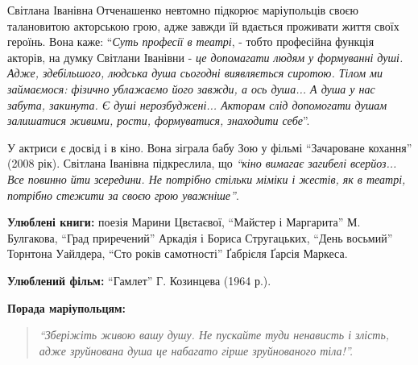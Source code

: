 Світлана Іванівна Отченашенко невтомно підкорює маріупольців своєю талановитою
акторською грою, адже завжди їй вдається проживати життя своїх героїнь. Вона
каже: \enquote{\emph{Суть професії в театрі}, - тобто професійна функція акторів, на думку
Світлани Іванівни - \emph{це допомагати людям у формуванні душі. Адже, здебільшого,
людська душа сьогодні виявляється сиротою. Тілом ми займаємося: фізично
ублажаємо його завжди, а ось душа... А душа у нас забута, закинута. Є душі
нерозбуджені... Акторам слід допомогати душам залишатися живими, рости,
формуватися, знаходити себе}}.

У актриси є досвід і в кіно. Вона зіграла бабу Зою у фільмі \enquote{Зачароване
кохання} (2008 рік). Світлана Іванівна підкреслила, що \emph{\enquote{кіно вимагає загибелі
всерйоз... Все повинно йти зсередини. Не потрібно стільки міміки і жестів, як в
театрі, потрібно стежити за своєю грою уважніше}}.


\textbf{Улюблені книги:} поезія Марини Цвєтаєвої, \enquote{Майстер і Маргарита} М.
Булгакова, \enquote{Град приречений} Аркадія і Бориса Стругацьких, \enquote{День восьмий}
Торнтона Уайлдера, \enquote{Сто років самотності} Ґабрієля Ґарсія Маркеса.

\textbf{Улюблений фільм:} \enquote{Гамлет} Г. Козинцева (1964 р.).

\textbf{Порада маріупольцям:} 

\begin{quote}
\em\enquote{Зберіжіть живою вашу душу. Не пускайте туди ненависть і злість, адже
зруйнована душа це набагато гірше зруйнованого тіла!}. 
\end{quote}

